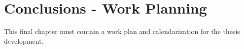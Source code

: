 
\chapter{Conclusions - Work Planning}
\label{chapter:conclusions}

This final chapter must contain a work plan and calendarization for the thesis development.


%
%
%
%

